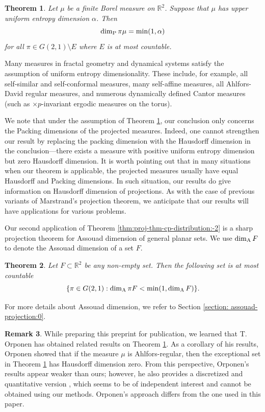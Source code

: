\documentclass[a4paper,11pt]{amsart}
\newtheorem{theorem}{Theorem}[section]
\theoremstyle{definition}
\newtheorem{remark}[theorem]{Remark}
\numberwithin{equation}{section}
\def\R{\mathbb R}
\begin{document}
\begin{theorem}\label{thm:main:-1}
Let $\mu$ be a finite Borel measure on $\R^2$.  Suppose that $\mu$ has upper uniform entropy dimension $\alpha$.  Then 
\[
\dim_{\rm P}\pi \mu=\min(1,\alpha)
\]
for all $\pi\in G(2,1)\setminus E$ where $E$ is at most countable.
\end{theorem}

Many measures in fractal geometry and dynamical systems satisfy the assumption of uniform entropy dimensionality. These include, for example, all self-similar and self-conformal measures, many self-affine measures, all Ahlfors-David regular measures, and numerous dynamically defined Cantor measures (such as $\times p$-invariant ergodic measures on the torus).

We note that under the assumption of Theorem \ref{thm:main:-1},  our conclusion only concerns the Packing dimensions of the projected measures.  Indeed, one cannot strengthen our result by replacing the packing dimension with the Hausdorff dimension in the conclusion—there exists a measure with positive uniform entropy dimension but zero Hausdorff dimension.
It is worth pointing out that in many situations when our theorem is applicable, the projected measures usually have equal Hausdorff and Packing dimensions.    In such situation, our results do give information on Hausdorff dimension of projections.
As with the case of previous variants of Marstrand's projection theorem,  we anticipate that our results will have applications for various problems.  

Our second application of Theorem \ref{thm:proj-thm-cp-distribution:-2} is a sharp projection theorem for Assouad dimension of general planar sets.  We use $\dim_{\rm A}F$ to denote the Assouad dimension of a set $F$.  

\begin{theorem}\label{thm:proj-Assouad:-2}
Let $F \subset \R^2$ be any non-empty set. Then the following set is at most countable
\[
\{\pi\in G(2,1): \dim_{\rm A}\pi  F<\min(1,\dim_{\rm A}F)\}.
\]
\end{theorem}
For more details about Assouad dimension,  we refer to Section \ref{section: assouad-projection:0}.



\begin{remark}
While preparing this preprint for publication, we learned that T. Orponen \cite{Orponen-2024} has obtained related results on Theorem \ref{thm:main:-1}. As a corollary of his results, Orponen showed that if the measure $\mu$ is Ahlfors-regular, then the exceptional set in Theorem \ref{thm:main:-1} has Hausdorff dimension zero. From this perspective, Orponen’s results appear weaker than ours; however, he also provides a discretized and quantitative version \cite[Theorem 1.3]{Orponen-2024}, which seems to be of independent interest and cannot be obtained using our methods.  Orponen’s approach differs from the one used in this paper.  
\end{remark}
\end{document}
